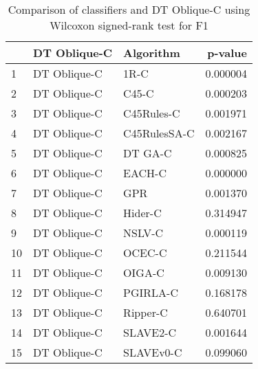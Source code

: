 \begin{table}
\footnotesize
\caption{Comparison of classifiers and DT Oblique-C using Wilcoxon signed-rank test for F1}
\label{tab:DT Oblique-C wilcoxon F1 comparison}
\begin{tabular}{lllr}
\hline
 & DT Oblique-C & Algorithm & p-value \\
\hline
1 & DT Oblique-C & 1R-C & 0.000004 \\
2 & DT Oblique-C & C45-C & 0.000203 \\
3 & DT Oblique-C & C45Rules-C & 0.001971 \\
4 & DT Oblique-C & C45RulesSA-C & 0.002167 \\
5 & DT Oblique-C & DT GA-C & 0.000825 \\
6 & DT Oblique-C & EACH-C & 0.000000 \\
7 & DT Oblique-C & GPR & 0.001370 \\
8 & DT Oblique-C & Hider-C & 0.314947 \\
9 & DT Oblique-C & NSLV-C & 0.000119 \\
10 & DT Oblique-C & OCEC-C & 0.211544 \\
11 & DT Oblique-C & OIGA-C & 0.009130 \\
12 & DT Oblique-C & PGIRLA-C & 0.168178 \\
13 & DT Oblique-C & Ripper-C & 0.640701 \\
14 & DT Oblique-C & SLAVE2-C & 0.001644 \\
15 & DT Oblique-C & SLAVEv0-C & 0.099060 \\
\hline
\end{tabular}
\end{table}
